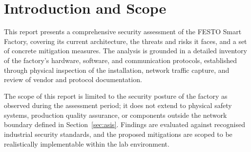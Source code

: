 \section{Introduction and Scope}
This report presents a comprehensive security assessment of the FESTO Smart Factory, covering its current architecture, the threats and risks it faces, and a set of concrete mitigation measures. The analysis is grounded in a detailed inventory of the factory's hardware, software, and communication protocols, established through physical inspection of the installation, network traffic capture, and review of vendor and protocol documentation.

The scope of this report is limited to the security posture of the factory as observed during the assessment period; it does not extend to physical safety systems, production quality assurance, or components outside the network boundary defined in Section~\ref{sec:asis}. Findings are evaluated against recognised industrial security standards, and the proposed mitigations are scoped to be realistically implementable within the lab environment.
